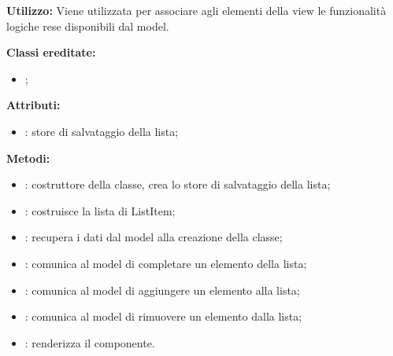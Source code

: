 \textbf{Utilizzo:}
Viene utilizzata per associare agli elementi della view le funzionalità logiche rese disponibili dal model.

\textbf{Classi ereditate:}
\begin{itemize}
	\item {};
\end{itemize}

\textbf{Attributi:}
\begin{itemize}
	\item {}: store di salvataggio della lista;
\end{itemize}

\textbf{Metodi:}
\begin{itemize}
	\item {}: costruttore della classe, crea lo store di salvataggio della lista;
	\item {}: costruisce la lista di ListItem;
	\item {}: recupera i dati dal model alla creazione della classe;
	\item {}: comunica al model di completare un elemento della lista;
	\item {}: comunica al model di aggiungere un elemento alla lista;
	\item {}: comunica al model di rimuovere un elemento dalla lista;
	\item {}: renderizza il componente.
\end{itemize}
